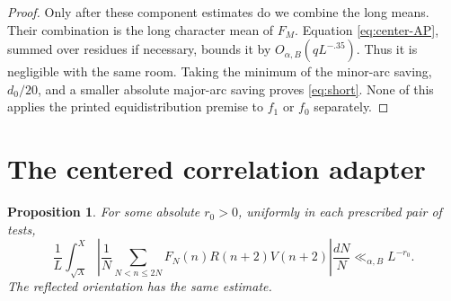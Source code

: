 \documentclass[11pt]{article}
\newtheorem{proposition}[theorem]{Proposition}
\theoremstyle{remark}\newtheorem{remark}[theorem]{Remark}
\begin{document}
\begin{proof}
Only after these component estimates do we combine the long means.
Their combination is the long character mean of $F_M$.
Equation \eqref{eq:center-AP}, summed over residues if necessary,
bounds it by $O_{\alpha,B}(qL^{-.35})$.
Thus it is negligible with the same room. Taking the minimum of the
minor-arc saving, $d_0/20$, and a smaller absolute major-arc saving
proves \eqref{eq:short}. None of this applies the printed
equidistribution premise to $f_1$ or $f_0$ separately.
\end{proof}

\section{The centered correlation adapter}
\begin{proposition}\label{prop:adapter}
For some absolute $r_0>0$, uniformly in each prescribed pair of tests,
\begin{equation}\label{eq:integrated}
 \frac1L\int_{\sqrt X}^X
 \left|\frac1N\sum_{N<n\le2N}
        F_N(n)R(n+2)V(n+2)\right|\frac{dN}{N}
                          \ll_{\alpha,B}L^{-r_0}.
\end{equation}
The reflected orientation has the same estimate.
\end{proposition}
\end{document}
